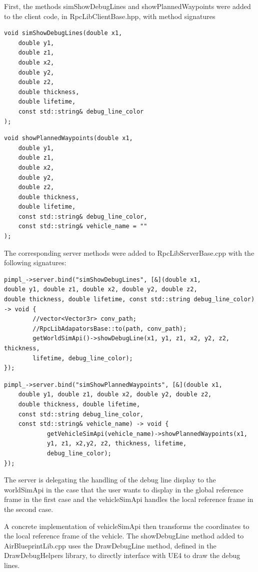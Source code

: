 First, the methods simShowDebugLines and showPlannedWaypoints were added to the client code, in RpcLibClientBase.hpp, with method signatures
\begin{verbatim}
void simShowDebugLines(double x1, 
    double y1,
    double z1,
    double x2,
    double y2,
    double z2,
    double thickness, 
    double lifetime,
    const std::string& debug_line_color
);
\end{verbatim}
\begin{verbatim}
void showPlannedWaypoints(double x1, 
    double y1, 
    double z1, 
    double x2, 
    double y2, 
    double z2, 
    double thickness, 
    double lifetime,
    const std::string& debug_line_color,
    const std::string& vehicle_name = ""
);
\end{verbatim}

The corresponding server methods were added to RpcLibServerBase.cpp with the following signatures:
\begin{verbatim}
pimpl_->server.bind("simShowDebugLines", [&](double x1,
double y1, double z1, double x2, double y2, double z2,
double thickness, double lifetime, const std::string debug_line_color)
-> void {
		//vector<Vector3r> conv_path;
		//RpcLibAdapatorsBase::to(path, conv_path);
		getWorldSimApi()->showDebugLine(x1, y1, z1, x2, y2, z2, thickness, 
		lifetime, debug_line_color);
});
\end{verbatim}

\begin{verbatim}
pimpl_->server.bind("simShowPlannedWaypoints", [&](double x1, 
    double y1, double z1, double x2, double y2, double z2, 
    double thickness, double lifetime, 
    const std::string debug_line_color,
    const std::string& vehicle_name) -> void {
            getVehicleSimApi(vehicle_name)->showPlannedWaypoints(x1, 
            y1, z1, x2,y2, z2, thickness, lifetime, 
            debug_line_color);
});
\end{verbatim}

The server is delegating the handling of the debug line display to the worldSimApi in the case that the user wants to display in the global reference frame in the first case and the vehicleSimApi handles the local reference frame in the second case. 

A concrete implementation of vehicleSimApi then transforms the coordinates to the local reference frame of the vehicle. The showDebugLine method added to AirBlueprintLib.cpp uses the DrawDebugLine method, defined in the DrawDebugHelpers library, to directly interface with UE4 to draw the debug lines.

